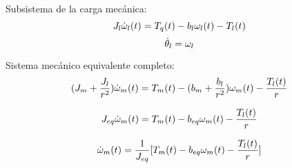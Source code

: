 \documentclass{article}
\begin{document}
Subsistema de la carga mecánica:
\begin{equation}
    \label{eq:3.1}
    J_{l}\dot{\omega}_{l}(t) = T_{q}(t)-b_{l}\omega_{l}(t)-T_{l}(t) \\
\end{equation}
\begin{equation}
    \label{eq:3.2}
    \dot{\theta}_{l} = \omega_{l}\\
\end{equation}

Sistema mecánico equivalente completo:
\begin{equation}
    \label{eq:4.1}
    (J_{m}+\frac{J_{l}}{r^2})\dot{\omega}_{m}(t) = T_{m}(t)-(b_{m}+\frac{b_{l}}{r^2})\omega_{m}(t)-\frac{T_{l}(t)}{r} \\
\end{equation}

\begin{equation}
    J_{eq}\dot{\omega}_{m}(t) = T_{m}(t)-b_{eq}\omega_{m}(t)-\frac{T_{l}(t)}{r} \\
\end{equation}

\begin{equation}
    \dot{\omega}_{m}(t) = \frac{1}{J_{eq}}[T_{m}(t) - b_{eq}\omega_{m}(t) - \frac{T_{l}(t)}{r}]\\
\end{equation}
\end{document}
